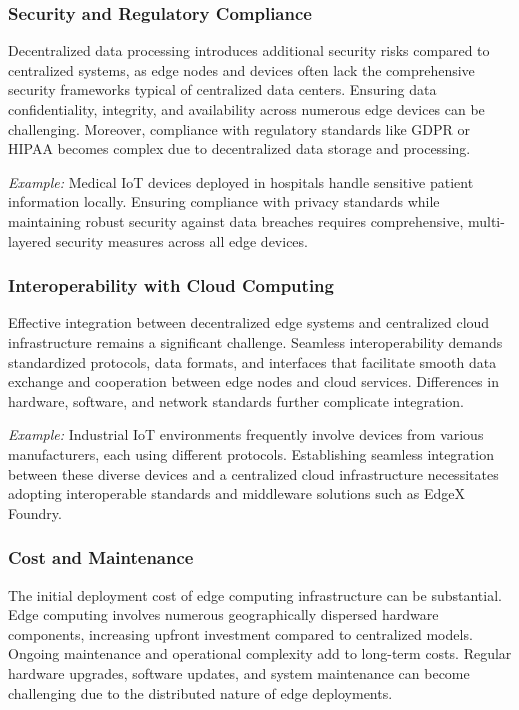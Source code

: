 \documentclass[runningheads]{llncs}
\begin{document}
\subsubsection{Security and Regulatory Compliance}
Decentralized data processing introduces additional security risks compared to centralized systems, as edge nodes and devices often lack the comprehensive security frameworks typical of centralized data centers. Ensuring data confidentiality, integrity, and availability across numerous edge devices can be challenging. Moreover, compliance with regulatory standards like GDPR or HIPAA becomes complex due to decentralized data storage and processing.

\textit{Example:} Medical IoT devices deployed in hospitals handle sensitive patient information locally. Ensuring compliance with privacy standards while maintaining robust security against data breaches requires comprehensive, multi-layered security measures across all edge devices.

\subsubsection{Interoperability with Cloud Computing}
Effective integration between decentralized edge systems and centralized cloud infrastructure remains a significant challenge. Seamless interoperability demands standardized protocols, data formats, and interfaces that facilitate smooth data exchange and cooperation between edge nodes and cloud services. Differences in hardware, software, and network standards further complicate integration.

\textit{Example:} Industrial IoT environments frequently involve devices from various manufacturers, each using different protocols. Establishing seamless integration between these diverse devices and a centralized cloud infrastructure necessitates adopting interoperable standards and middleware solutions such as EdgeX Foundry.

\subsubsection{Cost and Maintenance}
The initial deployment cost of edge computing infrastructure can be substantial. Edge computing involves numerous geographically dispersed hardware components, increasing upfront investment compared to centralized models. Ongoing maintenance and operational complexity add to long-term costs. Regular hardware upgrades, software updates, and system maintenance can become challenging due to the distributed nature of edge deployments.
\end{document}
